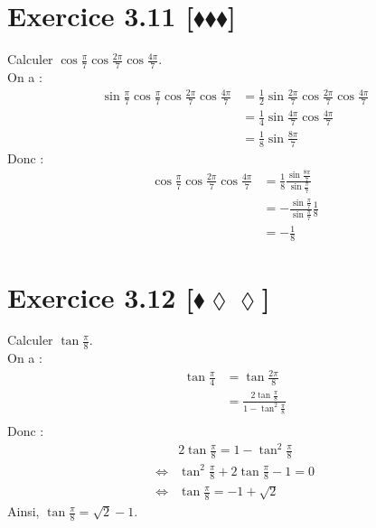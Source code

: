 \documentclass[10pt]{article}
\begin{document}

\section*{Exercice 3.11 [$\blacklozenge\blacklozenge\blacklozenge$]}
\begin{tcolorbox}[enhanced, width=6in, center, size=fbox, fontupper=\large, drop shadow southwest]
    Calculer $\cos\frac{\pi}{7}\cos\frac{2\pi}{7}\cos\frac{4\pi}{7}$.\\
    On a :
    \begin{align*}
        \sin\frac{\pi}{7}\cos\frac{\pi}{7}\cos\frac{2\pi}{7}\cos\frac{4\pi}{7}&=\frac{1}{2}\sin\frac{2\pi}{7}\cos\frac{2\pi}{7}\cos\frac{4\pi}{7}\\
        &=\frac{1}{4}\sin\frac{4\pi}{7}\cos\frac{4\pi}{7}\\
        &=\frac{1}{8}\sin\frac{8\pi}{7}
    \end{align*}
    Donc :
    \begin{align*}
        \cos\frac{\pi}{7}\cos\frac{2\pi}{7}\cos\frac{4\pi}{7}&=\frac{1}{8}\frac{\sin\frac{8\pi}{7}}{\sin\frac{\pi}{7}}\\
        &=-\frac{\sin\frac{\pi}{7}}{\sin\frac{\pi}{7}}\frac{1}{8}\\
        &=-\frac{1}{8}
    \end{align*}
\end{tcolorbox}


\section*{Exercice 3.12 [$\blacklozenge\lozenge\lozenge$]}
\begin{tcolorbox}[enhanced, width=6in, center, size=fbox, fontupper=\large, drop shadow southwest]
    Calculer $\tan\frac{\pi}{8}$.\\
    On a :
    \begin{align*}
        \tan\frac{\pi}{4}&=\tan\frac{2\pi}{8}\\
        &=\frac{2\tan\frac{\pi}{8}}{1-\tan^2\frac{\pi}{8}}\\
    \end{align*}
    Donc : 
    \begin{align*}
        &2\tan\frac{\pi}{8}=1-\tan^2\frac{\pi}{8}\\
        \iff&\tan^2\frac{\pi}{8}+2\tan\frac{\pi}{8}-1=0\\
        \iff&\tan\frac{\pi}{8}=-1+\sqrt{2}
    \end{align*}
    Ainsi, $\tan\frac{\pi}{8}=\sqrt{2}-1$.
\end{tcolorbox}
\end{document}
